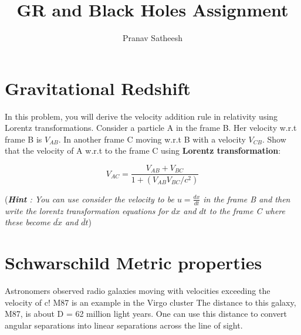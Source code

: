 \documentclass[10pt,a4paper]{article}
\author{Pranav Satheesh}
\title{GR and Black Holes Assignment}
\begin{document}
\maketitle

\section{Gravitational Redshift}

In this problem, you will derive the velocity addition rule in relativity using Lorentz transformations. Consider a particle A in the frame B. Her velocity w.r.t frame B is $V_{AB}$. In another frame C moving w.r.t B with a velocity $V_{CB}$. Show that the velocity of A w.r.t to the frame C using \textbf{Lorentz transformation}:

\begin{equation}
V_{AC} = \frac{V_{AB} + V_{BC}}{1 + (V_{AB} V_{BC} / c^2)}
\end{equation}

(\textit{\textbf{Hint} : You can use consider the velocity to be $u =\frac{dx}{dt}$ in the frame B and then write the lorentz transformation equations for $dx$ and $dt$ to the frame C where these become $\bar{dx}$ and $\bar{dt}$})

\section{Schwarschild Metric properties}
Astronomers observed radio galaxies moving with velocities exceeding the velocity of c!
M87 is an example in the Virgo cluster
The distance to this galaxy, M87, is about D = 62 million light years. One can use this distance to convert angular separations into linear separations across the line of sight. 
\end{document}
